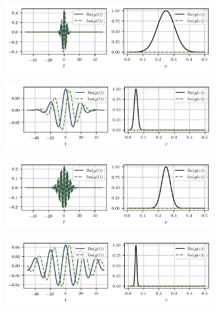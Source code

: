 \documentclass[journal]{IEEEtran}
\newcommand{\captext}[1]{\small{\textbf{\textsf{#1}}}}
\begin{document}
\begin{figure}[!ht] 

	\centering
	\begin{subfigure}[t]{\textwidth+20pt\relax}
    	\makebox[20pt]{\raisebox{40pt} {\captext{(a)}} }%
    	\includegraphics[width=\dimexpr\linewidth-20pt\relax]{1D_GaborFilter_hor_f4_g1}
    \end{subfigure}\vspace{-1em}
	\begin{subfigure}[t]{\textwidth+20pt\relax}
    	\makebox[20pt]{\raisebox{40pt} {\captext{(b)}} }%
    	\includegraphics[width=\dimexpr\linewidth-20pt\relax]{1D_GaborFilter_hor_f20_g1}
    \end{subfigure}\vspace{-1em}
	\begin{subfigure}[t]{\textwidth+20pt\relax}
    	\makebox[20pt]{\raisebox{40pt} {\captext{(c)}} }%
    	\includegraphics[width=\dimexpr\linewidth-20pt\relax]{1D_GaborFilter_hor_f4_g2}
    \end{subfigure}\vspace{-1em}
	\begin{subfigure}[t]{\textwidth+20pt\relax}
    	\makebox[20pt]{\raisebox{40pt} {\captext{(d)}} }%
    	\includegraphics[width=\dimexpr\linewidth-20pt\relax]{1D_GaborFilter_hor_f20_g2}
    \end{subfigure}\vspace{-1em}
	

\end{figure}
\end{document}
